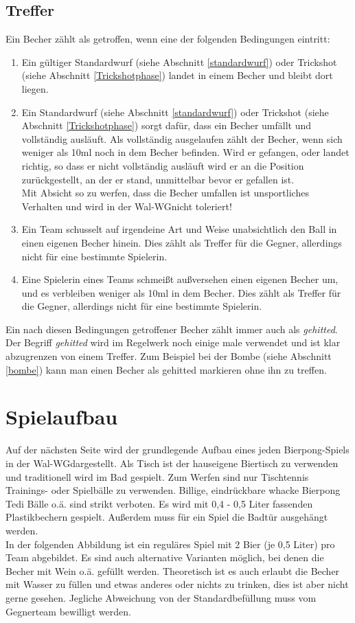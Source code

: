 \documentclass[a5paper, 12pt]{book}
\begin{document}
\section{Treffer}\label{treffer}
Ein Becher zählt als getroffen, wenn eine der folgenden Bedingungen eintritt:
\begin{enumerate} [(1)]
    \item Ein gültiger Standardwurf (siehe Abschnitt \ref{standardwurf}) oder Trickshot (siehe Abschnitt \ref{Trickshotphase}) landet in einem Becher und bleibt dort liegen.\\
    \item Ein Standardwurf (siehe Abschnitt \ref{standardwurf}) oder Trickshot (siehe Abschnitt \ref{Trickshotphase}) sorgt dafür, dass ein Becher umfällt und vollständig ausläuft. Als vollständig ausgelaufen zählt der Becher, wenn sich weniger als 10ml noch in dem Becher befinden. Wird er gefangen, oder landet richtig, so dass er nicht vollständig ausläuft wird er an die Position zurückgestellt, an der er stand, unmittelbar bevor er gefallen ist. \\
Mit Absicht so zu werfen, dass die Becher umfallen ist unsportliches Verhalten und wird in der Wal-WG\texttrademark nicht toleriert!
\item Ein Team schusselt auf irgendeine Art und Weise unabsichtlich den Ball in einen eigenen Becher hinein. Dies zählt als Treffer für die Gegner, allerdings nicht für eine bestimmte Spielerin.

\item  Eine Spielerin eines Teams schmeißt außversehen einen eigenen Becher um, und es verbleiben weniger als 10ml in dem Becher. Dies zählt als Treffer für die Gegner, allerdings nicht für eine bestimmte Spielerin. 
\end{enumerate}
Ein nach diesen Bedingungen getroffener Becher zählt immer auch als \textit{gehitted}. Der Begriff \textit{gehitted} wird im Regelwerk noch einige male verwendet und ist klar abzugrenzen von einem Treffer. Zum Beispiel bei der Bombe (siehe Abschnitt \ref{bombe}) kann man einen Becher als gehitted markieren ohne ihn zu treffen. 
\chapter{Spielaufbau} \label{spielaufbau}
Auf der nächsten Seite wird der grundlegende Aufbau eines jeden Bierpong-Spiels in der Wal-WG\texttrademark dargestellt. Als Tisch ist der hauseigene Biertisch zu verwenden und traditionell wird im Bad gespielt. Zum Werfen sind nur Tischtennis Trainings- oder Spielbälle zu verwenden. Billige, eindrückbare whacke Bierpong Tedi Bälle o.ä. sind strikt verboten. Es wird mit 0,4 - 0,5 Liter fassenden Plastikbechern gespielt. Außerdem muss für ein Spiel die Badtür ausgehängt werden. \\
In der folgenden Abbildung ist ein reguläres Spiel mit 2 Bier (je 0,5 Liter) pro Team abgebildet. Es sind auch alternative Varianten möglich, bei denen die Becher mit Wein o.ä. gefüllt werden. Theoretisch ist es auch erlaubt die Becher mit Wasser zu füllen und etwas anderes oder nichts zu trinken, dies ist aber nicht gerne gesehen. Jegliche Abweichung von der Standardbefüllung muss vom Gegnerteam bewilligt werden.
\end{document}
